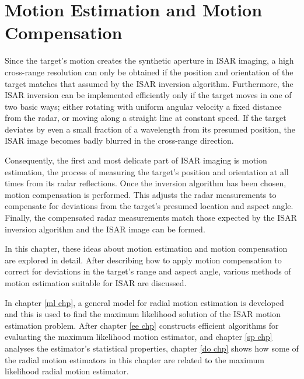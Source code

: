 %
%
%
%
%
%
%

\chapter{Motion Estimation and Motion Compensation}
\label{mc chp}



\bigletter Since the target's motion creates the synthetic aperture in ISAR
imaging, a high cross-range resolution can only be obtained if the position
and orientation of the target matches that assumed by the ISAR inversion
algorithm.  Furthermore, the ISAR inversion can be implemented efficiently
only if the target moves in one of two basic ways; either rotating with
uniform angular velocity a fixed distance from the radar, or moving along a
straight line at constant speed.  If the target deviates by even a small
fraction of a wavelength from its presumed position, the ISAR image becomes
badly blurred in the cross-range direction.  

Consequently, the first and most delicate part of ISAR imaging is motion
estimation, the process of measuring the target's position and orientation
at all times from its radar reflections.  Once the inversion algorithm has
been chosen, motion compensation is performed.  This adjusts the radar
measurements to compensate for deviations from the target's presumed
location and aspect angle.  Finally, the compensated radar measurements
match those expected by the ISAR inversion algorithm and the ISAR image can
be formed.

In this chapter, these ideas about motion estimation and motion compensation
are explored in detail.  After describing how to apply motion compensation
to correct for deviations in the target's range and aspect angle, various
methods of motion estimation suitable for ISAR are discussed.   

In chapter \ref{ml chp}, a general model for radial motion estimation is
developed and this is used to find the maximum likelihood solution of the
ISAR motion estimation problem. After chapter \ref{ee chp} constructs
efficient algorithms for evaluating the maximum likelihood motion
estimator, and chapter \ref{sp chp} analyses the estimator's statistical
properties, chapter \ref{do chp} shows how some of the radial motion
estimators in this chapter are related to the maximum likelihood radial
motion estimator.

